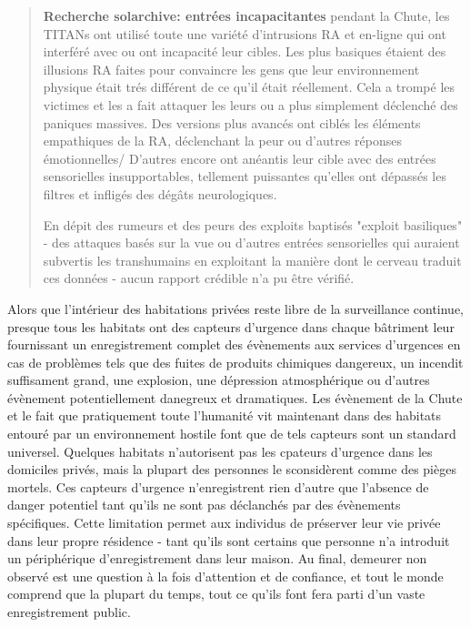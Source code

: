 \begin{quotation} \textbf{Recherche solarchive: entrées incapacitantes } pendant la Chute, les TITANs ont utilisé toute une variété d'intrusions RA et en-ligne qui ont interféré avec ou ont incapacité leur cibles. Les plus basiques étaient des illusions RA faites pour convaincre les gens que leur environnement physique était trés différent de ce qu'il était réellement. Cela a trompé les victimes et les a fait attaquer les leurs ou a plus simplement déclenché des paniques massives. Des versions plus avancés ont ciblés les éléments empathiques de la RA, déclenchant la peur ou d'autres réponses émotionnelles/ D'autres encore ont anéantis leur cible avec des entrées sensorielles insupportables, tellement puissantes qu'elles ont dépassés les filtres et infligés des dégâts neurologiques. 

En dépit des rumeurs et des peurs des exploits baptisés "exploit basiliques" - des attaques basés sur la vue ou d'autres entrées sensorielles qui auraient subvertis les transhumains en exploitant la manière dont le cerveau traduit ces données - aucun rapport crédible n'a pu être vérifié. \end{quotation} 

Alors que l'intérieur des habitations privées reste libre de la surveillance continue, presque tous les habitats ont des capteurs d'urgence dans chaque bâtriment leur fournissant un enregistrement complet des évènements aux services d'urgences en cas de problèmes tels que des fuites de produits chimiques dangereux, un incendit suffisament grand, une explosion, une dépression atmosphérique ou d'autres évènement potentiellement danegreux et dramatiques. Les évènement de la Chute et le fait que pratiquement toute l'humanité vit maintenant dans des habitats entouré par un environnement hostile font que de tels capteurs sont un standard universel. Quelques habitats n'autorisent pas les cpateurs d'urgence dans les domiciles privés, mais la plupart des personnes le sconsidèrent comme des pièges mortels. Ces capteurs d'urgence n'enregistrent rien d'autre que l'absence de danger potentiel tant qu'ils ne sont pas déclanchés par des évènements spécifiques. Cette limitation permet aux individus de préserver leur vie privée dans leur propre résidence - tant qu'ils sont certains que personne n'a introduit un périphérique d'enregistrement dans leur maison. Au final, demeurer non observé est une question à la fois d'attention et de confiance, et tout le monde comprend que la plupart du temps, tout ce qu'ils font fera parti d'un vaste enregistrement public. 

